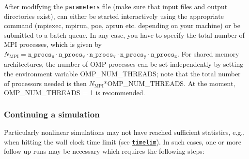 \documentclass[12pt]{article}
\begin{document}
After modifying the \texttt{parameters} file (make sure that
input files and output directories exist), \gene can either
be started interactively using the appropriate command (mpiexec, mpirun, poe, aprun etc. depending on your
machine) or be submitted to a batch queue. In any case, you have to
specify the total number of MPI processes, which is given by
$N_\mathrm{MPI}=\mathtt{n\_procs_s}\cdot
\mathtt{n\_procs_w}\cdot\mathtt{n\_procs_v}\cdot\mathtt{n\_procs_y}\cdot\mathtt{n\_procs_z}$.
For shared memory architectures, the number of OMP processes can
be set independently by setting the environment variable
OMP\_NUM\_THREADS; note that the total number of processors needed
is then $N_\mathrm{MPI}$*OMP\_NUM\_THREADS. At the moment,
OMP\_NUM\_THREADS = 1 is recommended.

\subsubsection{Continuing a simulation}\label{subsubsec:continue_sim}

Particularly nonlinear simulations may not have reached sufficient statistics, e.g.,
when hitting the wall clock time limit (see \hyperlink{timelim}{\tt timelim}).
In such cases, one or more follow-up runs may be necessary which requires the following steps:
\end{document}
